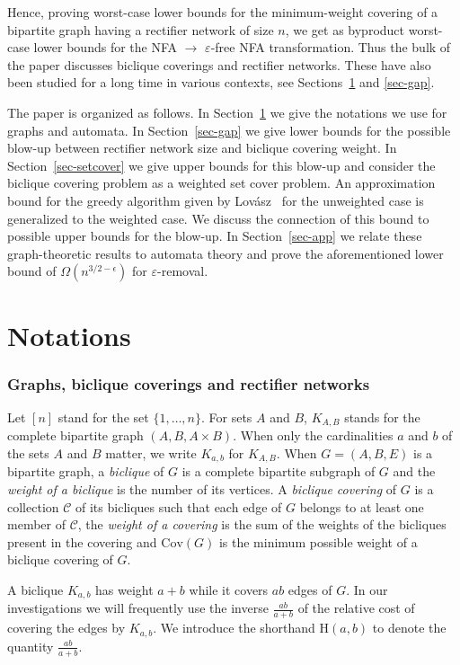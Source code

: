 \documentclass[submission]{llncs}
\def\Cov{{\mathrm{Cov}}}
\def\Harm{{\mathrm{H}}}
\begin{document}
  Hence, proving worst-case lower bounds for the minimum-weight covering of a bipartite graph having a rectifier network of size $n$,
  we get as byproduct worst-case lower bounds for the NFA $\to$ $\varepsilon$-free NFA transformation.
  Thus the bulk of the paper discusses biclique coverings and rectifier networks. These have also been studied for a long time in
various contexts, see Sections~\ref{sec-notations} and \ref{sec-gap}.

  The paper is organized as follows. In Section~\ref{sec-notations} we give the notations we use for graphs and automata.
  In Section~\ref{sec-gap} we give lower bounds for the possible blow-up between rectifier network size and biclique covering weight.
  In Section~\ref{sec-setcover} we give upper bounds for this blow-up and consider
  the biclique covering problem as a weighted set cover problem. An approximation bound for the greedy algorithm
  given by Lov\'asz~\cite{Lovasz1975383} for the unweighted case is generalized to the weighted case.
  We discuss the connection of this bound to possible upper bounds for the blow-up.
  In Section~\ref{sec-app} we relate these graph-theoretic results to automata theory and prove the aforementioned
  lower bound of $\Omega(n^{3/2-\epsilon})$ for $\varepsilon$-removal.
\section{Notations}
\label{sec-notations}
\subsubsection{Graphs, biclique coverings and rectifier networks}
  Let $[n]$ stand for the set $\{1,\ldots,n\}$.
  For sets $A$ and $B$, $K_{A,B}$ stands for the complete bipartite graph $(A,B,A\times B)$.
  When only the cardinalities $a$ and $b$ of the sets $A$ and $B$ matter, we write $K_{a,b}$ for $K_{A,B}$.
  When $G=(A,B,E)$ is a bipartite graph,
  a \emph{biclique} of $G$ is a complete bipartite subgraph of $G$ and
  the \emph{weight of a biclique} is the number of its vertices.
  A \emph{biclique covering} of $G$ is a collection $\mathcal{C}$ of its bicliques such that each edge of $G$ belongs to at least one member of $\mathcal{C}$,
  the \emph{weight of a covering} is the sum of the weights of the bicliques present in the covering
  and $\Cov(G)$ is the minimum possible weight of a biclique covering of $G$.

  A biclique $K_{a,b}$ has weight $a+b$ while it covers $ab$ edges of $G$.
  In our investigations we will frequently use the inverse $\frac{ab}{a+b}$ of the relative cost of covering the edges by $K_{a,b}$.
  We introduce the shorthand $\Harm(a,b)$ to denote the quantity $\frac{ab}{a+b}$.
\end{document}
